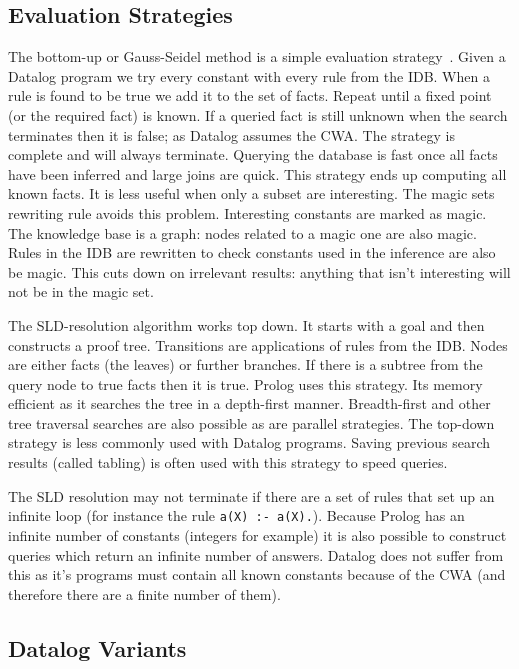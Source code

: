 \documentclass[thesis.tex]{subfiles}
\begin{document}
\subsection{Evaluation Strategies}

The bottom-up or Gauss-Seidel method is a simple evaluation
strategy~\cite{ceri_what_1989}. Given a Datalog program we try every
constant with every rule from the IDB. When a rule is found to be true
we add it to the set of facts. Repeat until a fixed point (or the
required fact) is known. If a queried fact is still unknown when the
search terminates then it is false; as Datalog assumes the CWA. The
strategy is complete and will always terminate.  Querying the database
is fast once all facts have been inferred and large joins are quick.
This strategy ends up computing all known facts. It is less useful
when only a subset are interesting. The magic
sets~\cite{bancilhon_magic_1986} rewriting rule avoids this
problem. Interesting constants are marked as magic. The knowledge base
is a graph: nodes related to a magic one are also magic. Rules in the
IDB are rewritten to check constants used in the inference are also be
magic. This cuts down on irrelevant results: anything that isn't
interesting will not be in the magic set.

The SLD-resolution algorithm works top down. It starts with a goal and
then constructs a proof tree. Transitions are applications of rules
from the IDB. Nodes are either facts (the leaves) or further
branches. If there is a subtree from the query node to true facts then
it is true. Prolog uses this strategy. Its memory efficient as it
searches the tree in a depth-first manner. Breadth-first and other
tree traversal searches are also possible as are parallel
strategies. The top-down strategy is less commonly used with Datalog
programs. Saving previous search results (called tabling) is often
used with this strategy to speed queries.

The SLD resolution may not terminate if there are a set of rules that
set up an infinite loop (for instance the rule \lstinline!a(X) :- a(X).!).
Because Prolog has an infinite number of constants (integers
for example) it is also possible to construct queries which return an
infinite number of answers. Datalog does not suffer from this as it's
programs must contain all known constants because of the \ac{CWA} (and
therefore there are a finite number of them).


\subsection{Datalog Variants}
\end{document}
